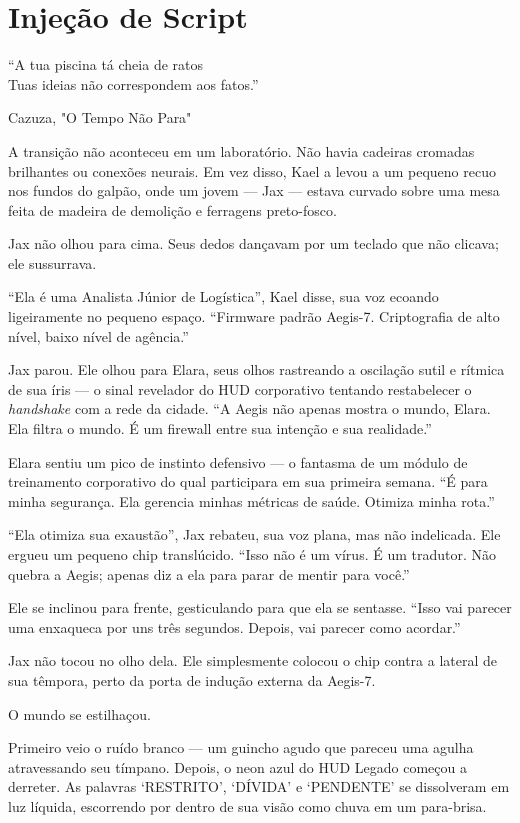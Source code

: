 
\chapter{Injeção de Script}
\epigraph{``A tua piscina tá cheia de ratos \\ Tuas ideias não correspondem aos fatos.''}{Cazuza, "O Tempo Não Para"}

A transição não aconteceu em um laboratório. Não havia cadeiras cromadas brilhantes ou conexões neurais. Em vez disso, Kael a levou a um pequeno recuo nos fundos do galpão, onde um jovem --- Jax --- estava curvado sobre uma mesa feita de madeira de demolição e ferragens preto-fosco.

Jax não olhou para cima. Seus dedos dançavam por um teclado que não clicava; ele sussurrava.

``Ela é uma Analista Júnior de Logística'', Kael disse, sua voz ecoando ligeiramente no pequeno espaço. ``Firmware padrão Aegis-7. Criptografia de alto nível, baixo nível de agência.''

Jax parou. Ele olhou para Elara, seus olhos rastreando a oscilação sutil e rítmica de sua íris --- o sinal revelador do HUD corporativo tentando restabelecer o \textit{handshake} com a rede da cidade. ``A Aegis não apenas mostra o mundo, Elara. Ela filtra o mundo. É um firewall entre sua intenção e sua realidade.''

Elara sentiu um pico de instinto defensivo --- o fantasma de um módulo de treinamento corporativo do qual participara em sua primeira semana. ``É para minha segurança. Ela gerencia minhas métricas de saúde. Otimiza minha rota.''

``Ela otimiza sua exaustão'', Jax rebateu, sua voz plana, mas não indelicada. Ele ergueu um pequeno chip translúcido. ``Isso não é um vírus. É um tradutor. Não quebra a Aegis; apenas diz a ela para parar de mentir para você.''

Ele se inclinou para frente, gesticulando para que ela se sentasse. ``Isso vai parecer uma enxaqueca por uns três segundos. Depois, vai parecer como acordar.''

Jax não tocou no olho dela. Ele simplesmente colocou o chip contra a lateral de sua têmpora, perto da porta de indução externa da Aegis-7. 

O mundo se estilhaçou.

Primeiro veio o ruído branco --- um guincho agudo que pareceu uma agulha atravessando seu tímpano. Depois, o neon azul do HUD Legado começou a derreter. As palavras `RESTRITO', `DÍVIDA' e `PENDENTE' se dissolveram em luz líquida, escorrendo por dentro de sua visão como chuva em um para-brisa.

